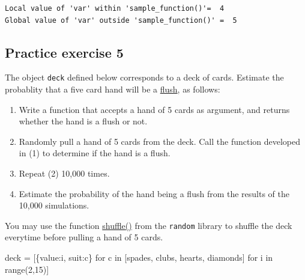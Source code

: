 \documentclass[
  letterpaper,
  DIV=11,
  numbers=noendperiod]{scrreprt}
\newenvironment{Shaded}{\begin{snugshade}}{\end{snugshade}}
\newcommand{\BuiltInTok}[1]{\textcolor[rgb]{0.00,0.23,0.31}{#1}}
\newcommand{\ControlFlowTok}[1]{\textcolor[rgb]{0.00,0.23,0.31}{#1}}
\newcommand{\DecValTok}[1]{\textcolor[rgb]{0.68,0.00,0.00}{#1}}
\newcommand{\KeywordTok}[1]{\textcolor[rgb]{0.00,0.23,0.31}{#1}}
\newcommand{\NormalTok}[1]{\textcolor[rgb]{0.00,0.23,0.31}{#1}}
\newcommand{\OperatorTok}[1]{\textcolor[rgb]{0.37,0.37,0.37}{#1}}
\newcommand{\StringTok}[1]{\textcolor[rgb]{0.13,0.47,0.30}{#1}}
\providecommand{\tightlist}{%
  \setlength{\itemsep}{0pt}\setlength{\parskip}{0pt}}\usepackage{longtable,booktabs,array}
\begin{document}
\begin{verbatim}
Local value of 'var' within 'sample_function()'=  4
Global value of 'var' outside 'sample_function()' =  5
\end{verbatim}

\hypertarget{practice-exercise-5}{%
\subsection{Practice exercise 5}\label{practice-exercise-5}}

The object \texttt{deck} defined below corresponds to a deck of cards.
Estimate the probablity that a five card hand will be a
\href{https://en.wikipedia.org/wiki/Flush_(cards)}{flush}, as follows:

\begin{enumerate}
\def\labelenumi{\arabic{enumi}.}
\tightlist
\item
  Write a function that accepts a hand of 5 cards as argument, and
  returns whether the hand is a flush or not.
\item
  Randomly pull a hand of 5 cards from the deck. Call the function
  developed in (1) to determine if the hand is a flush.
\item
  Repeat (2) 10,000 times.
\item
  Estimate the probability of the hand being a flush from the results of
  the 10,000 simulations.
\end{enumerate}

You may use the function
\href{https://docs.python.org/3/library/random.html}{shuffle()} from the
\texttt{random} library to shuffle the deck everytime before pulling a
hand of 5 cards.

\begin{Shaded}
\begin{Highlighting}[]
\NormalTok{deck }\OperatorTok{=}\NormalTok{ [\{}\StringTok{\textquotesingle{}value\textquotesingle{}}\NormalTok{:i, }\StringTok{\textquotesingle{}suit\textquotesingle{}}\NormalTok{:c\}}
\ControlFlowTok{for}\NormalTok{ c }\KeywordTok{in}\NormalTok{ [}\StringTok{\textquotesingle{}spades\textquotesingle{}}\NormalTok{, }\StringTok{\textquotesingle{}clubs\textquotesingle{}}\NormalTok{, }\StringTok{\textquotesingle{}hearts\textquotesingle{}}\NormalTok{, }\StringTok{\textquotesingle{}diamonds\textquotesingle{}}\NormalTok{]}
\ControlFlowTok{for}\NormalTok{ i }\KeywordTok{in} \BuiltInTok{range}\NormalTok{(}\DecValTok{2}\NormalTok{,}\DecValTok{15}\NormalTok{)]}
\end{Highlighting}
\end{Shaded}
\end{document}
